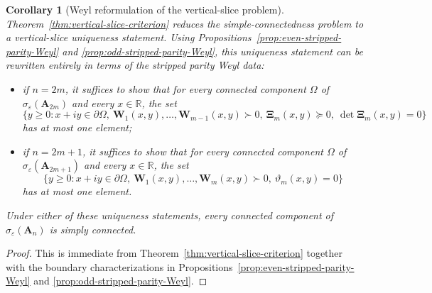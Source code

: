 \documentclass[11pt]{article}
\newtheorem{corollary}[theorem]{Corollary}
\begin{document}
\begin{corollary}[Weyl reformulation of the vertical-slice problem]\label{cor:remaining-vertical-slice-problem}
Theorem~\ref{thm:vertical-slice-criterion} reduces the simple-connectedness problem to a vertical-slice uniqueness statement.
Using Propositions~\ref{prop:even-stripped-parity-Weyl} and \ref{prop:odd-stripped-parity-Weyl}, this uniqueness statement can be rewritten entirely in terms of the stripped parity Weyl data:

\begin{itemize}
\item if \(n=2m\), it suffices to show that for every connected component \(\Omega\) of \(\sigma_\varepsilon(\mathbf{A}_{2m})\) and every \(x\in\mathbb{R}\), the set
\[
\bigl\{y\ge 0:x+iy\in\partial\Omega,\ \mathbf{W}_1(x,y),\dots,\mathbf{W}_{m-1}(x,y)\succ 0,\ \boldsymbol{\Xi}_m(x,y)\succeq 0,\ \det \boldsymbol{\Xi}_m(x,y)=0\bigr\}
\]
has at most one element;

\item if \(n=2m+1\), it suffices to show that for every connected component \(\Omega\) of \(\sigma_\varepsilon(\mathbf{A}_{2m+1})\) and every \(x\in\mathbb{R}\), the set
\[
\bigl\{y\ge 0:x+iy\in\partial\Omega,\ \mathbf{W}_1(x,y),\dots,\mathbf{W}_m(x,y)\succ 0,\ \vartheta_m(x,y)=0\bigr\}
\]
has at most one element.
\end{itemize}

Under either of these uniqueness statements, every connected component of \(\sigma_\varepsilon(\mathbf{A}_n)\) is simply connected.
\end{corollary}

\begin{proof}
This is immediate from Theorem~\ref{thm:vertical-slice-criterion} together with the boundary characterizations in Propositions~\ref{prop:even-stripped-parity-Weyl} and \ref{prop:odd-stripped-parity-Weyl}.
\end{proof}
\end{document}
